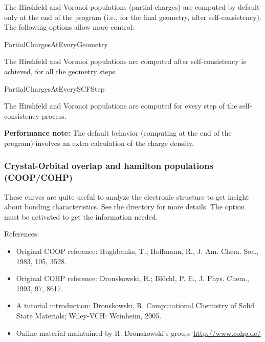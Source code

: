 The Hirshfeld and Voronoi populations (partial charges) are computed
by default only at the end of the program (i.e., for the final
geometry, after self-consistency). The following options allow more
control:

\begin{fdflogicalF}{PartialChargesAtEveryGeometry}

  The Hirshfeld and Voronoi populations are computed after
  self-consistency is achieved, for all the geometry steps.

\end{fdflogicalF}

\begin{fdflogicalF}{PartialChargesAtEverySCFStep}

  The Hirshfeld and Voronoi populations are computed for every step of
  the self-consistency process.

\end{fdflogicalF}

\textbf{Performance note:}
The default behavior (computing at the end of the program) involves
an extra calculation of the charge density.



\subsubsection{Crystal-Orbital overlap and hamilton populations (COOP/COHP)}
\label{sec:coop}

These curves are quite useful to analyze the electronic structure to
get insight about bonding characteristics. See the 
directory for more details. The  option must be
activated to get the information needed.

References:
\begin{itemize}
  \item%
  Original COOP reference:
  Hughbanks, T.; Hoffmann, R., J. Am. Chem. Soc., 1983, 105, 3528.

  \item%
  Original COHP reference: Dronskowski, R.; Blöchl, P. E., J. Phys. Chem., 1993, 97, 8617.

  \item%
  A tutorial introduction: Dronskowski, R. Computational Chemistry of Solid State
  Materials; Wiley-VCH: Weinheim, 2005.

  \item%
  Online material maintained by R. Dronskowski's group: \url{http://www.cohp.de/}
\end{itemize}


